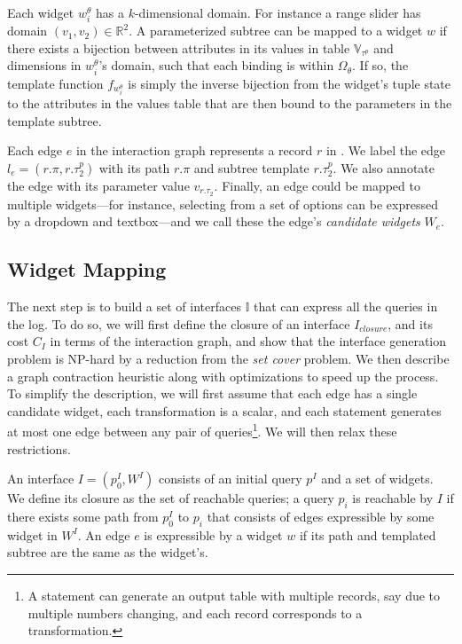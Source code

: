 Each widget $w_i^\theta$ has a $k$-dimensional domain.  For instance a range slider has domain $(v_1, v_2) \in \mathbb{R}^2$.  A parameterized subtree can be mapped to a widget $w$ if there exists a bijection between attributes in its values in table $\mathbb{V}_{\tau^p}$ and dimensions in $w_i^\theta$'s domain, such that each binding is within $\Omega_\theta$.  If so, the template function $f_{w_i^\theta}$ is simply the inverse bijection from the widget's tuple state to the attributes in the values table that are then bound to the parameters in the template subtree.

  Each edge $e$ in the interaction graph represents a record $r$ in \diffspil.  We label the edge $l_e = (r.\pi, r.\tau_2^p)$ with its path $r.\pi$ and subtree template $r.\tau_2^p$.   We also annotate the edge with its parameter value $v_{r.\tau_2}$.   Finally, an edge could be mapped to multiple widgets---for instance, selecting from a set of options can be expressed by a dropdown and textbox---and we call these the edge's {\it candidate widgets} $W_e$.


\subsection{Widget Mapping}
The next step is to build a set of interfaces $\mathbb{I}$ that can express all the queries in the log.  To do so, we will first define the closure of an interface $I_{closure}$, and its cost $C_I$ in terms of the interaction graph, and show that the interface generation problem is NP-hard by a reduction from the {\it set cover} problem.   We then describe a graph contraction heuristic along with optimizations to speed up the process.  To simplify the description, we will first assume that each edge has a single candidate widget, each transformation is a scalar, and each \lang statement generates at most one edge between any pair of queries\footnote{\small{A \lang statement can generate an output table with multiple records, say due to multiple numbers changing, and each record corresponds to a transformation.}}.  We will then relax these restrictions.

An interface $I = (p^I_0, W^I)$ consists of an initial query $p^I$ and a set of widgets.  We define its closure as the set of reachable queries; a query $p_i$ is reachable by $I$ if there exists some path from $p^I_0$ to $p_i$ that consists of edges expressible by some widget in $W^I$.  An edge $e$ is expressible by a widget $w$ if its path and templated subtree are the same as the widget's.

